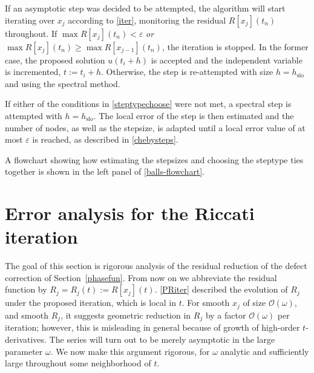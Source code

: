 \documentclass[10pt]{article}
\newcommand{\bigO}{{\mathcal O}}
\newcommand{\om}{\omega}
\begin{document}
If an asymptotic step was decided to be attempted, the algorithm will start
iterating over $x_j$ according to \cref{iter}, monitoring the residual
$R[x_j](t_n)$ throughout. If $\max R[x_j](t_n) < \varepsilon$ \emph{or} $\max
R[x_j](t_n) \geq \max R[x_{j-1}](t_n)$, the iteration is stopped. In the former
case, the proposed solution $u(t_i+h)$ is accepted and the independent variable
is incremented, $t := t_i + h$. Otherwise, the step is re-attempted with size
$h = h_{\text{slo}}$ and using the spectral method. 

If either of the conditions in \cref{steptypechoose} were not met, a spectral
step is attempted with $h = h_{\text{slo}}$. The local error of the step is
then estimated and the number of nodes, as well as the stepsize, is
adapted until a local error value of at most $\varepsilon$ is reached, as described in
\cref{chebysteps}.

A flowchart showing how estimating the stepsizes and choosing the steptype ties
together is shown in the left panel of \cref{balls-flowchart}.


\section{Error analysis for the Riccati iteration\label{errorana}}

The goal of this section is rigorous analysis of the residual
reduction of the defect correction of Section~\ref{phasefun}.
From now on we abbreviate the residual function by $R_j = R_j(t) := R[x_j](t)$.
\cref{PRiter} described the evolution of $R_j$
under the proposed iteration, which is local in $t$.
For smooth $x_j$ of size $\bigO(\om)$, and smooth $R_j$,
it suggests geometric reduction in $R_j$ by a factor $\bigO(\om)$ per iteration;
however, this is misleading in general because of
growth of high-order $t$-derivatives.
The series will turn out to be merely asymptotic in the large parameter $\om$.
We now make this argument rigorous, for $\om$ analytic
and sufficiently large throughout some neighborhood of $t$.

\end{document}
